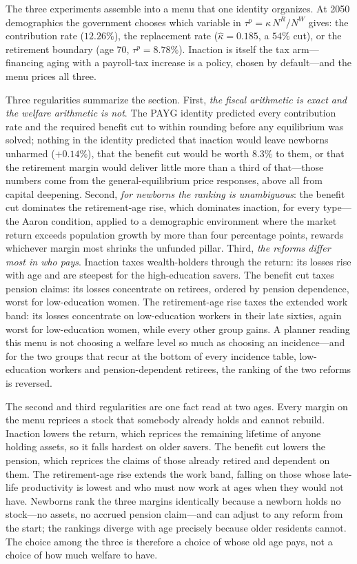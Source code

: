 \documentclass[12pt,a4paper]{article}
\begin{document}
The three experiments assemble into a menu that one identity organizes. At 2050 demographics the government chooses which variable in $\tau^p=\kappa\,N^R/N^W$ gives: the contribution rate ($12.26\%$), the replacement rate ($\widehat\kappa=0.185$, a $54\%$ cut), or the retirement boundary (age 70, $\tau^p=8.78\%$). Inaction is itself the tax arm---financing aging with a payroll-tax increase is a policy, chosen by default---and the menu prices all three.

Three regularities summarize the section. First, \emph{the fiscal arithmetic is exact and the welfare arithmetic is not}. The PAYG identity predicted every contribution rate and the required benefit cut to within rounding before any equilibrium was solved; nothing in the identity predicted that inaction would leave newborns unharmed ($+0.14\%$), that the benefit cut would be worth $8.3\%$ to them, or that the retirement margin would deliver little more than a third of that---those numbers come from the general-equilibrium price responses, above all from capital deepening. Second, \emph{for newborns the ranking is unambiguous}: the benefit cut dominates the retirement-age rise, which dominates inaction, for every type---the Aaron condition, applied to a demographic environment where the market return exceeds population growth by more than four percentage points, rewards whichever margin most shrinks the unfunded pillar. Third, \emph{the reforms differ most in who pays}. Inaction taxes wealth-holders through the return: its losses rise with age and are steepest for the high-education savers. The benefit cut taxes pension claims: its losses concentrate on retirees, ordered by pension dependence, worst for low-education women. The retirement-age rise taxes the extended work band: its losses concentrate on low-education workers in their late sixties, again worst for low-education women, while every other group gains. A planner reading this menu is not choosing a welfare level so much as choosing an incidence---and for the two groups that recur at the bottom of every incidence table, low-education workers and pension-dependent retirees, the ranking of the two reforms is reversed.

The second and third regularities are one fact read at two ages. Every margin on the menu reprices a stock that somebody already holds and cannot rebuild. Inaction lowers the return, which reprices the remaining lifetime of anyone holding assets, so it falls hardest on older savers. The benefit cut lowers the pension, which reprices the claims of those already retired and dependent on them. The retirement-age rise extends the work band, falling on those whose late-life productivity is lowest and who must now work at ages when they would not have. Newborns rank the three margins identically because a newborn holds no stock---no assets, no accrued pension claim---and can adjust to any reform from the start; the rankings diverge with age precisely because older residents cannot. The choice among the three is therefore a choice of whose old age pays, not a choice of how much welfare to have.
\end{document}
